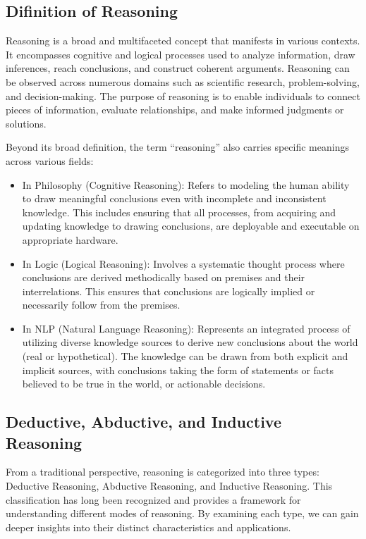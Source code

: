 \subsection{Difinition of Reasoning}

Reasoning is a broad and multifaceted concept that manifests in various contexts. 
It encompasses cognitive and logical processes used to analyze information, draw 
inferences, reach conclusions, and construct coherent arguments. Reasoning can be 
observed across numerous domains such as scientific research, problem-solving, and 
decision-making. The purpose of reasoning is to enable individuals to connect pieces 
of information, evaluate relationships, and make informed judgments or solutions. 

Beyond its broad definition, the term “reasoning” also carries specific meanings across various fields:
\begin{itemize}
    \item In Philosophy (Cognitive Reasoning): Refers to modeling the human ability to draw meaningful conclusions even with incomplete and inconsistent knowledge. This includes ensuring that all processes, from acquiring and updating knowledge to drawing conclusions, are deployable and executable on appropriate hardware.
    \item In Logic (Logical Reasoning): Involves a systematic thought process where conclusions are derived methodically based on premises and their interrelations. This ensures that conclusions are logically implied or necessarily follow from the premises.
    \item In NLP (Natural Language Reasoning): Represents an integrated process of utilizing diverse knowledge sources to derive new conclusions about the world (real or hypothetical). The knowledge can be drawn from both explicit and implicit sources, with conclusions taking the form of statements or facts believed to be true in the world, or actionable decisions.
\end{itemize}

\subsection{Deductive, Abductive, and Inductive Reasoning}

From a traditional perspective, reasoning is categorized into three types: Deductive Reasoning, Abductive Reasoning, and Inductive Reasoning. This classification has long been recognized and provides a framework for understanding different modes of reasoning. By examining each type, we can gain deeper insights into their distinct characteristics and applications.

